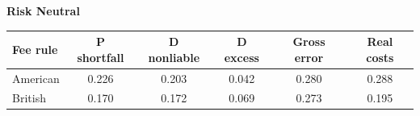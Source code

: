 \documentclass[10pt,border=5pt,varwidth=17cm]{standalone}
\begin{document}
\begingroup
\small
\setlength{\tabcolsep}{5pt}
\renewcommand{\arraystretch}{1.20}
\noindent\textbf{Risk Neutral}\par\smallskip
\noindent\begin{tabularx}{\linewidth}{@{}>{\raggedright\arraybackslash}Xccccc@{}}
\toprule
\textbf{Fee rule} & \textbf{P shortfall} & \textbf{D nonliable} & \textbf{D excess} & \textbf{Gross error} & \textbf{Real costs} \\
\midrule
American & 0.226 & 0.203 & 0.042 & 0.280 & 0.288 \\
British & 0.170 & 0.172 & 0.069 & 0.273 & 0.195 \\
\bottomrule\end{tabularx}\par\medskip
\endgroup
\end{document}
